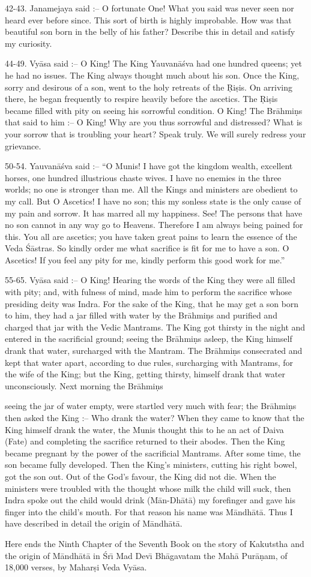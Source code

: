 42-43. Janamejaya said :-- O fortunate One! What you said was never seen nor heard ever before since. This sort of birth is highly improbable. How was that beautiful son born in the belly of his father? Describe this in detail and satisfy my curiosity.

44-49. Vy\=asa said :-- O King! The King Yauvan\=a\'sva had one hundred queens; yet he had no issues. The King always thought much about his son. Once the King, sorry and desirous of a son, went to the holy retreats of the \d{R}i\d{s}is. On arriving there, he began frequently to respire heavily before the ascetics. The \d{R}i\d{s}is became filled with pity on seeing his sorrowful condition. O King! The Br\=ahmi\d{n}s that said to him :-- O King! Why are you thus sorrowful and distressed? What is your sorrow that is troubling your heart? Speak truly. We will surely redress your grievance.

50-54. Yauvan\=a\'sva said :-- ``O Munis! I have got the kingdom wealth, excellent horses, one hundred illustrious chaste wives. I have no enemies in the three worlds; no one is stronger than me. All the Kings and ministers are obedient to my call. But O Ascetics! I have no son; this my sonless state is the only cause of my pain and sorrow. It has marred all my happiness. See! The persons that have no son cannot in any way go to Heavens. Therefore I am always being pained for this. You all are ascetics; you have taken great pains to learn the essence of the Veda \'S\=astras. So kindly order me what sacrifice is fit for me to have a son. O Ascetics! If you feel any pity for me, kindly perform this good work for me.''

55-65. Vy\=asa said :-- O King! Hearing the words of the King they were all filled with pity; and, with fulness of mind, made him to perform the sacrifice whose presiding deity was Indra. For the sake of the King, that he may get a son born to him, they had a jar filled with water by the Br\=ahmi\d{n}s and purified and charged that jar with the Vedic Mantrams. The King got thirsty in the night and entered in the sacrificial ground; seeing the Br\=ahmi\d{n}s asleep, the King himself drank that water, surcharged with the Mantram. The Br\=ahmi\d{n}s consecrated and kept that water apart, according to due rules, surcharging with Mantrams, for the wife of the King; but the King, getting thirsty, himself drank that water unconsciously. Next morning the Br\=ahmi\d{n}s

seeing the jar of water empty, were startled very much with fear; the Br\=ahmi\d{n}s then asked the King :-- Who drank the water? When they came to know that the King himself drank the water, the Munis thought this to he an act of Daiva (Fate) and completing the sacrifice returned to their abodes. Then the King became pregnant by the power of the sacrificial Mantrams. After some time, the son became fully developed. Then the King's ministers, cutting his right bowel, got the son out. Out of the God's favour, the King did not die. When the ministers were troubled with the thought whose milk the child will suck, then Indra spoke out the child would drink (M\=an-Dh\=at\=a) my forefinger and gave his finger into the child's mouth. For that reason his name was M\=andh\=at\=a. Thus I have described in detail the origin of M\=andh\=at\=a.

Here ends the Ninth Chapter of the Seventh Book on the story of Kakutstha and the origin of M\=andh\=at\=a in \'Sr\={\i} Mad Dev\={\i} Bh\=agavatam the Mah\=a Pur\=a\d{n}am, of 18,000 verses, by Mahar\d{s}i Veda Vy\=asa.



